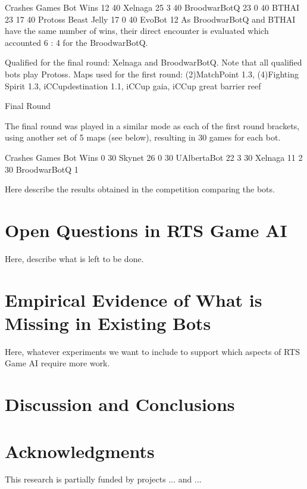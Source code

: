 \documentclass[journal]{IEEEtran}
\begin{document}
{Crashes	 Games	 Bot	 Wins
12	 40	 Xelnaga	 25
3	 40	 BroodwarBotQ	 23
0	 40	 BTHAI	 23
17	 40	 Protoss Beast Jelly	 17
0	 40	 EvoBot	 12
As BroodwarBotQ and BTHAI have the same number of wins, their direct encounter is evaluated which accounted 6 : 4 for the BroodwarBotQ.

Qualified for the final round: Xelnaga and BroodwarBotQ. Note that all qualified bots play Protoss.
Maps used for the first round: (2)MatchPoint 1.3, (4)Fighting Spirit 1.3, iCCupdestination 1.1, iCCup gaia, iCCup great barrier reef

Final Round

The final round was played in a similar mode as each of the first round brackets, using another set of 5 maps (see below), resulting in 30 games for each bot.

Crashes	 Games	 Bot	 Wins
0	 30	 Skynet	 26
0	 30	 UAlbertaBot	 22
3	 30	 Xelnaga	 11
2	 30	 BroodwarBotQ	 1


Here describe the results obtained in the competition comparing the bots.
}



\section{Open Questions in RTS Game AI}\label{sec:questions}

{\color{blue}
Here, describe what is left to be done.
}


\section{Empirical Evidence of What is Missing in Existing Bots}\label{sec:experiments}

{\color{blue}
Here, whatever experiments we want to include to support which aspects of RTS Game AI require more work.
}

\section{Discussion and Conclusions}\label{sec:conclusions}



\section*{Acknowledgments} {\color{blue} This research is partially funded by projects ... and ... }
\end{document}
